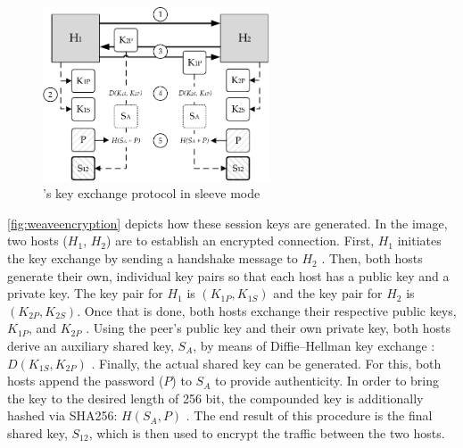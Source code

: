 \begin{figure}[htpb]
  \centering
  \includegraphics[width=0.6\textwidth]{figures/weave-encryption.pdf}
  \caption[\weave 's key exchange protocol]{\wnet 's key exchange protocol in sleeve mode}\label{fig:weaveencryption}
\end{figure} 
\autoref{fig:weaveencryption} depicts how these session keys are generated. In the image, two hosts ($H_1$, $H_2$) are to establish an encrypted connection. First, $H_1$ initiates the key exchange by sending a handshake message to $H_2$ . Then, both hosts generate their own, individual key pairs so that each host has a public key and a private key. The key pair for $H_1$ is $(K_{1P}, K_{1S})$ and the key pair for $H_2$ is $(K_{2P}, K_{2S})$. Once that is done, both hosts exchange their respective public keys, $K_{1P}$, and $K_{2P}$ . Using the peer's public key and their own private key, both hosts derive an auxiliary shared key, $S_A$, by means of Diffie--Hellman key exchange \cite{bresson2001provably}: $D(K_{1S},K_{2P})$ . Finally, the actual shared key can be generated. For this, both hosts append the password ($P$) to $S_A$ to provide authenticity. In order to bring the key to the desired length of 256 bit, the compounded key is additionally hashed via SHA256: $H(S_A, P)$ . The end result of this procedure is the final shared key, $S_{12}$, which is then used to encrypt the traffic between the two hosts.
%
%
%
%
%
%
%
%
%
%
%
%
%
%
%
%
%
%
%
%